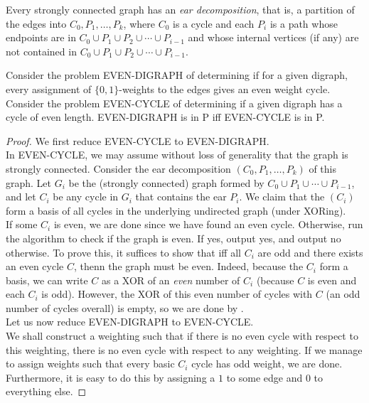 
\begin{fprop}
	Every strongly connected graph has an \emph{ear decomposition}, that is, a partition of the edges into $C_0,P_1,\ldots,P_k$, where $C_0$ is a cycle and each $P_i$ is a path whose endpoints are in $C_0 \cup P_1 \cup P_2 \cup \cdots \cup P_{i-1}$ and whose internal vertices (if any) are not contained in $C_0 \cup P_1 \cup P_2 \cup \cdots \cup P_{i-1}$.
\end{fprop}

\begin{ftheo}
	Consider the problem EVEN-DIGRAPH of determining if for a given digraph, every assignment of $\{0,1\}$-weights to the edges gives an even weight cycle. Consider the problem EVEN-CYCLE of determining if a given digraph has a cycle of even length. EVEN-DIGRAPH is in \textsf{P} iff EVEN-CYCLE is in \textsf{P}.
\end{ftheo}
\begin{proof}
	We first reduce EVEN-CYCLE to EVEN-DIGRAPH.\\
	In EVEN-CYCLE, we may assume without loss of generality that the graph is strongly connected. Consider the ear decomposition $(C_0,P_1,\ldots,P_k)$ of this graph. Let $G_i$ be the (strongly connected) graph formed by $C_0 \cup P_1 \cup \cdots \cup P_{i-1}$, and let $C_i$ be any cycle in $G_i$ that contains the ear $P_i$. We claim that the $(C_i)$ form a basis of all cycles in the underlying undirected graph (under XORing).\\
	If some $C_i$ is even, we are done since we have found an even cycle. Otherwise, run the algorithm to check if the graph is even. If yes, output yes, and output no otherwise. To prove this, it suffices to show that iff all $C_i$ are odd and there exists an even cycle $C$, thenn the graph must be even. Indeed, because the $C_i$ form a basis, we can write $C$ as a XOR of an \emph{even} number of $C_i$ (because $C$ is even and each $C_i$ is odd). However, the XOR of this even number of cycles with $C$ (an odd number of cycles overall) is empty, so we are done by .\\

	Let us now reduce EVEN-DIGRAPH to EVEN-CYCLE.\\
	We shall construct a weighting such that if there is no even cycle with respect to this weighting, there is no even cycle with respect to any weighting. If we manage to assign weights such that every basic $C_i$ cycle has odd weight, we are done. Furthermore, it is easy to do this by assigning a $1$ to some edge and $0$ to everything else.
\end{proof}

